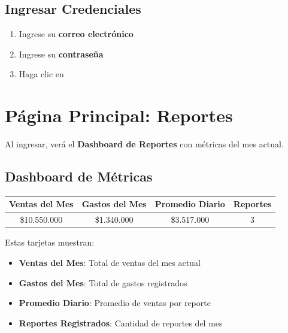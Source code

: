 \documentclass[12pt,a4paper]{article}
\begin{document}
\subsection{Ingresar Credenciales}

\begin{center}
\end{center}

\begin{enumerate}
    \item Ingrese su \textbf{correo electrónico}
    \item Ingrese su \textbf{contraseña}
    \item Haga clic en 
\end{enumerate}

\newpage

\section{Página Principal: Reportes}

Al ingresar, verá el \textbf{Dashboard de Reportes} con métricas del mes actual.

\subsection{Dashboard de Métricas}

\begin{center}
\begin{tabular}{|c|c|c|c|}
\hline
\rowcolor{primary!20}
\textbf{Ventas del Mes} & \textbf{Gastos del Mes} & \textbf{Promedio Diario} & \textbf{Reportes} \\
\hline
\$10.550.000 & \$1.340.000 & \$3.517.000 & 3 \\
\hline
\end{tabular}
\end{center}

Estas tarjetas muestran:
\begin{itemize}
    \item \textbf{Ventas del Mes}: Total de ventas del mes actual
    \item \textbf{Gastos del Mes}: Total de gastos registrados
    \item \textbf{Promedio Diario}: Promedio de ventas por reporte
    \item \textbf{Reportes Registrados}: Cantidad de reportes del mes
\end{itemize}
\end{document}
